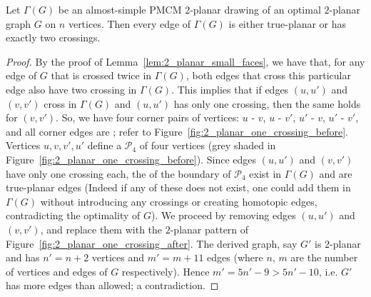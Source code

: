 \begin{lemma}\label{lem:2_planar_one_crossing}
Let $\Gamma(G)$ be an almost-simple PMCM $2$-planar drawing of an optimal $2$-planar graph $G$ on $n$ vertices. Then every edge of $\Gamma(G)$ is either true-planar or has exactly two crossings.
\end{lemma}
\begin{proof}
By the proof of Lemma~\ref{lem:2_planar_small_faces}, we have that, for any edge of $G$ that is crossed twice in $\Gamma(G)$, both edges that cross this particular edge also have two crossing in $\Gamma(G)$. This implies that if edges $(u,u')$ and $(v,v')$ cross in $\Gamma(G)$ and $(u,u')$ has only one crossing, then the same holds for $(v,v')$. So, we have four corner pairs of  vertices: $u$ - $v$, $u$ - $v'$, $u'$ - $v$, $u'$ - $v'$, and all corner edges are \pes; refer to Figure~\ref{fig:2_planar_one_crossing_before}. Vertices  $u,v,v',u'$ define a \pp $\mathcal{P}_4$ of four vertices (grey shaded in Figure~\ref{fig:2_planar_one_crossing_before}). Since edges $(u,u')$ and $(v,v')$ have only one crossing each, the \pes of the boundary of $\mathcal{P}_4$ exist in $\Gamma(G)$ and are true-planar edges (Indeed if any of these \pes does not exist, one could add them in $\Gamma(G)$ without introducing any crossings or creating homotopic edges, contradicting the optimality of $G$). We proceed by removing  edges $(u,u')$ and $(v,v')$, and replace them with the $2$-planar pattern of Figure~\ref{fig:2_planar_one_crossing_after}. The derived graph, say $G'$ is $2$-planar and has $n'=n+2$ vertices and $m'=m+11$ edges (where $n$, $m$ are the number of vertices and edges of $G$ respectively). Hence $m'=5n'-9>5n'-10$, i.e. $G'$ has more edges than allowed; a contradiction.

\end{proof}


